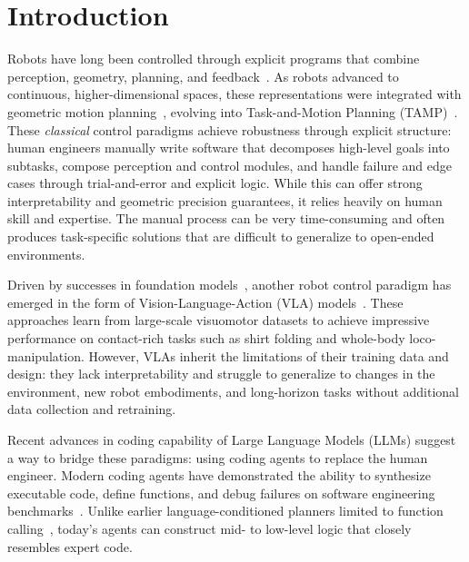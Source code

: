\section{Introduction}
Robots have long been controlled through explicit programs that combine perception, geometry, planning, and feedback~\citep{fikes1971strips, murray1994mathematical, aeronautiques1998pddl, siciliano2008springer}. As robots advanced to continuous, higher-dimensional spaces, these representations were integrated with geometric motion planning~\citep{khatib1986real}, evolving into Task-and-Motion Planning (TAMP)~\citep{kaelbling2011hierarchical}. These \textit{classical} control paradigms achieve robustness through explicit structure: human engineers manually write software that decomposes high-level goals into subtasks, compose perception and control modules, and handle failure and edge cases through trial-and-error and explicit logic. While this can offer strong interpretability and geometric precision guarantees, it relies heavily on human skill and expertise. The manual process can be very time-consuming and often produces task-specific solutions that are difficult to generalize to open-ended environments. 

Driven by successes in foundation models~\citep{devlin2018bert, radford2018improving, radford2019language, brown2020language, chowdhery2023palm, achiam2023gpt, radford2021learning, li2023blip}, another robot control paradigm has emerged in the form of Vision-Language-Action (VLA) models~\citep{brohan2023rt2, kim2024openvlaopensourcevisionlanguageactionmodel, octo_2023, jang2022bc, jiang2022vima, reed2022generalist, 2024rtx, shah2023vint, fu2024icrt, huang2025otter, bjorck2025gr00t, lbmtri2025, intelligence2025pi05}. These approaches learn from large-scale visuomotor datasets to achieve impressive performance on contact-rich tasks such as shirt folding and whole-body loco-manipulation. However, VLAs inherit the limitations of their training data and design: they lack interpretability and struggle to generalize to changes in the environment, new robot embodiments, and long-horizon tasks without additional data collection and retraining.

Recent advances in coding capability of Large Language Models (LLMs) suggest a way to bridge these paradigms: using coding agents to replace the human engineer. Modern coding agents have demonstrated the ability to synthesize executable code, define functions, and debug failures on software engineering benchmarks~\citep{jimenez2024swebench}. Unlike earlier language-conditioned planners limited to function calling~\citep{tellex2011understanding}, today's agents can construct mid- to low-level logic that closely resembles expert code. 

